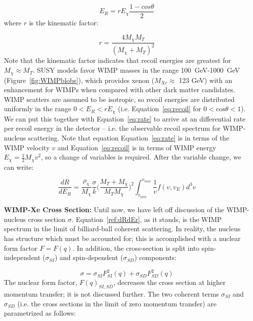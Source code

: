 \begin{equation}
\label{eq:recoil}
E_{R} = r E_{\chi} \frac{1 - cos\theta}{2}
\end{equation}
where $r$ is the kinematic factor:

\begin{equation}
r = \frac{ 4 M_{\chi}M_{T} }{ (M_{\chi} + M_{T})^{2}}
\end{equation}
Note that the kinematic factor indicates that recoil energies are greatest for $M_{\chi} \approx M_{T}$. \ac{SUSY} models favor \ac{WIMP} masses in the range 100~GeV-1000~GeV (Figure~\ref{fig:WIMPblobs}), which provides xenon ($M_{Xe} \approx$ 123 GeV) with an enhancement for \ac{WIMP}s when compared with other dark matter candidates. \ac{WIMP} scatters are assumed to be isotropic, so recoil energies are distributed uniformly in the range $0 < E_{R} < rE_{\chi}$ (i.e. Equation~\ref{eq:recoil} for $0 < \mathrm{cos}\theta < 1$). We can put this together with Equation~\ref{eq:rate} to arrive at an differential rate per recoil energy in the detector -- i.e. the observable recoil spectrum for \ac{WIMP}-nucleus scattering. Note that equation Equation~\ref{eq:rate} is in terms of the \ac{WIMP} velocity $v$ and Equation~\ref{eq:recoil} is in terms of \ac{WIMP} energy $E_{\chi} = \frac{1}{2}M_{\chi}v^{2}$, so a change of variables is required. After the variable change, we can write:

\begin{equation}
\label{ref:dRdEr}
\frac{dR}{dE_{R}} =  \frac{\rho_{\chi}}{M_{\chi}} \frac{\sigma}{k} \Big( \frac{ M_{T} + M_{\chi}}{M_{T} M_{\chi}} \Big)^{2} \int_{v_{min}}^{v_{max}} \frac{1}{v} f(v,v_{E}) d^{3}v
\end{equation}

\textbf{WIMP-Xe Cross Section:} Until now, we have left off discussion of the \ac{WIMP}-nucleus cross section $\sigma$. Equation~\ref{ref:dRdEr}, as it stands, is the \ac{WIMP} spectrum in the limit of billiard-ball coherent scattering. In reality, the nucleus has structure which must be accounted for; this is accomplished with a nuclear form factor $F = F(q)$. In addition, the cross-section is split into spin-independent ($\sigma_{SI}$) and spin-dependent ($\sigma_{SD}$) components:

\begin{equation}
\sigma = \sigma_{SI}F^{2}_{SI}(q) + \sigma_{SD}F^{2}_{SD}(q)
\end{equation}
The nuclear form factor, $F(q)_{SI, SD}$, decreases the cross section at higher momentum transfer; it is not discussed further. The two coherent terms $\sigma_{SI}$ and  $\sigma_{SD}$ (i.e. the cross sections in the limit of zero momentum transfer) are parametrized as follows:

